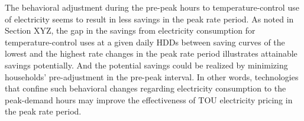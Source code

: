 The behavioral adjustment during the pre-peak hours to temperature-control use of electricity seems to result in less savings in the peak rate period. As noted in Section XYZ, the gap in the savings from electricity consumption for temperature-control uses at a given daily HDDs between saving curves of the lowest and the highest rate changes in the peak rate period illustrates attainable savings potentially. And the potential savings could be realized by minimizing households' pre-adjustment in the pre-peak interval. In other words, technologies that confine such behavioral changes regarding electricity consumption to the peak-demand hours may improve the effectiveness of TOU electricity pricing in the peak rate period. 

